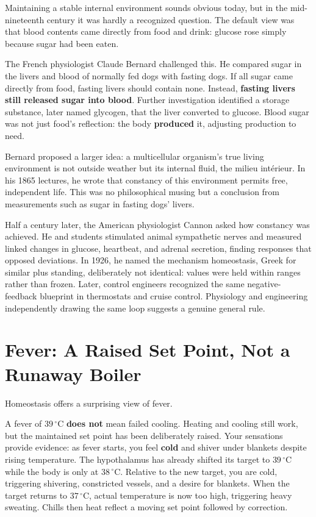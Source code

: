 \begin{zhengju}
Maintaining a stable internal environment sounds obvious today, but in the mid-nineteenth century it was hardly a recognized question. The default view was that blood contents came directly from food and drink: glucose rose simply because sugar had been eaten.

The French physiologist Claude Bernard challenged this. He compared sugar in the livers and blood of normally fed dogs with fasting dogs. If all sugar came directly from food, fasting livers should contain none. Instead, \textbf{fasting livers still released sugar into blood}. Further investigation identified a storage substance, later named glycogen, that the liver converted to glucose. Blood sugar was not just food's reflection: the body \textbf{produced} it, adjusting production to need.

Bernard proposed a larger idea: a multicellular organism's true living environment is not outside weather but its internal fluid, the milieu intérieur. In his 1865 lectures, he wrote that constancy of this environment permits free, independent life. This was no philosophical musing but a conclusion from measurements such as sugar in fasting dogs' livers.

Half a century later, the American physiologist Cannon asked how constancy was achieved. He and students stimulated animal sympathetic nerves and measured linked changes in glucose, heartbeat, and adrenal secretion, finding responses that opposed deviations. In 1926, he named the mechanism homeostasis, Greek for similar plus standing, deliberately not identical: values were held within ranges rather than frozen. Later, control engineers recognized the same negative-feedback blueprint in thermostats and cruise control. Physiology and engineering independently drawing the same loop suggests a genuine general rule.
\end{zhengju}

\section{Fever: A Raised Set Point, Not a Runaway Boiler}

Homeostasis offers a surprising view of fever.

A fever of $39\,^{\circ}\mathrm{C}$ \textbf{does not} mean failed cooling. Heating and cooling still work, but the maintained set point has been deliberately raised. Your sensations provide evidence: as fever starts, you feel \textbf{cold} and shiver under blankets despite rising temperature. The hypothalamus has already shifted its target to $39\,^{\circ}\mathrm{C}$ while the body is only at $38\,^{\circ}\mathrm{C}$. Relative to the new target, you are cold, triggering shivering, constricted vessels, and a desire for blankets. When the target returns to $37\,^{\circ}\mathrm{C}$, actual temperature is now too high, triggering heavy sweating. Chills then heat reflect a moving set point followed by correction.

